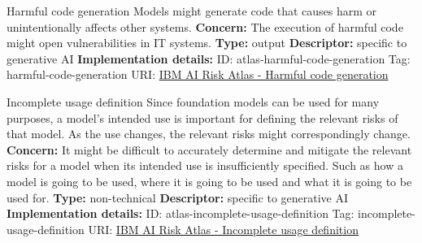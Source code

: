 \begin{definitionbox}{Harmful code generation}
Models might generate code that causes harm or unintentionally affects other systems.\newline\newline
\textbf{Concern: }The execution of harmful code might open vulnerabilities in IT systems.\newline\newline
\textbf{Type: }output\newline
\textbf{Descriptor: }specific to generative AI \newline\newline
\textbf{Implementation details: } \newline
ID: atlas-harmful-code-generation \newline
Tag: harmful-code-generation \newline
URI:  \href{https://www.ibm.com/docs/en/watsonx/saas?topic=SSYOK8/wsj/ai-risk-atlas/harmful-code-generation.html}{IBM AI Risk Atlas - Harmful code generation}\newline
\end{definitionbox}
\begin{definitionbox}{Incomplete usage definition}
Since foundation models can be used for many purposes, a model's intended use is important for defining the relevant risks of that model. As the use changes, the relevant risks might correspondingly change.\newline\newline
\textbf{Concern: }It might be difficult to accurately determine and mitigate the relevant risks for a model when its intended use is insufficiently specified. Such as how a model is going to be used, where it is going to be used and what it is going to be used for.\newline\newline
\textbf{Type: }non-technical\newline
\textbf{Descriptor: }specific to generative AI \newline\newline
\textbf{Implementation details: } \newline
ID: atlas-incomplete-usage-definition \newline
Tag: incomplete-usage-definition \newline
URI:  \href{https://www.ibm.com/docs/en/watsonx/saas?topic=SSYOK8/wsj/ai-risk-atlas/incomplete-usage-definition.html}{IBM AI Risk Atlas - Incomplete usage definition}\newline
\end{definitionbox}
